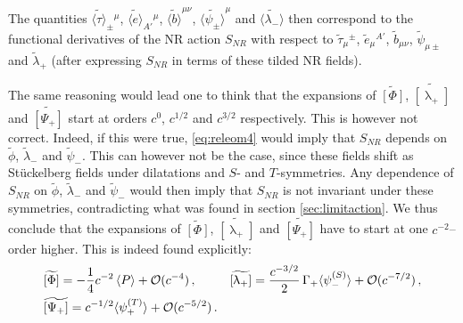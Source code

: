 \documentclass[a4paper,10pt,openany]{article}
\begin{document}
	The quantities $\widetilde{\langle \tau\rangle}_\pm{}^\mu$, $\widetilde{\langle e\rangle}_{A'}{}^\mu$, $\widetilde{\langle b\rangle}^{\mu\nu}$, $\widetilde{\langle\psi_\pm\rangle}^\mu$ and $\widetilde{\langle\lambda_-\rangle}$ then correspond to the functional derivatives of the NR action $S_{NR}$ with respect to $\tilde{\tau}_\mu{}^\pm$, $\tilde{e}_\mu{}^{A'}$, $\tilde{b}_{\mu\nu}$, $\tilde{\psi}_{\mu \pm}$ and $\tilde{\lambda}_+$ (after expressing $S_{NR}$ in terms of these tilded NR fields).
	
	The same reasoning would lead one to think that the expansions of $\widetilde{[\Phi]}$, $\widetilde{[\uplambda_+]}$ and $\widetilde{[\Psi_+]}$ start at orders $c^0$, $c^{1/2}$ and $c^{3/2}$ respectively. This is however not correct. Indeed, if this were true, \eqref{eq:releom4} would imply that $S_{NR}$ depends on $\tilde{\phi}$, $\tilde{\lambda}_-$ and $\tilde{\psi}_-$. This can however not be the case, since these fields shift as St\"uckelberg fields under dilatations and $S$- and $T$-symmetries. Any dependence of $S_{NR}$ on $\tilde{\phi}$, $\tilde{\lambda}_-$ and $\tilde{\psi}_-$ would then imply that $S_{NR}$ is not invariant under these symmetries, contradicting what was found in section \ref{sec:limitaction}. We thus conclude that the expansions of $\widetilde{[\Phi]}$, $\widetilde{[\uplambda_+]}$ and $\widetilde{[\Psi_+]}$ have to start at one $c^{-2}$--order higher. This is indeed found explicitly:
	\begin{align}\label{eq:misseom}
		&\widetilde{[\Phi]} = -\frac{1}{4} c^{-2} \, \langle P\rangle + \mathcal O(c^{-4})\,, && \widetilde{[\uplambda_+]} = \frac{c^{-3/2}}{2}\,\Gamma_+\langle\psi_-^{(S)}\rangle + \mathcal O (c^{-7/2})  \,, \notag\\
		&\widetilde{[\Psi_{+}]} = c^{-1/2}\langle \psi_+^{(T)}\rangle + \mathcal O(c^{-5/2}) \,.
	\end{align}
\end{document}
